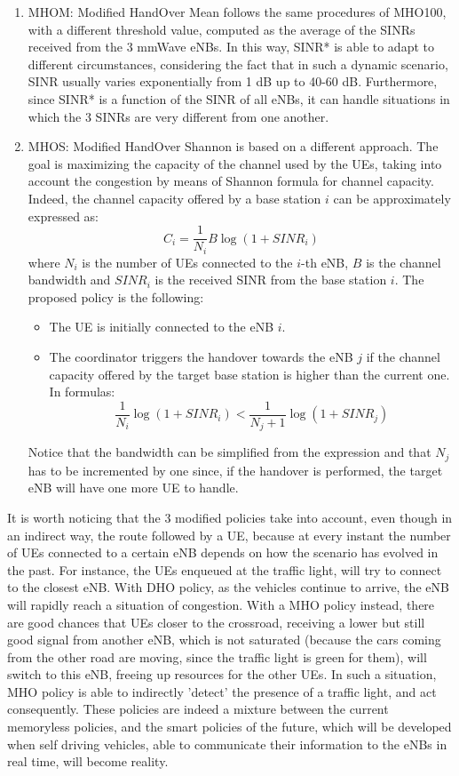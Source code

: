 \documentclass[conference,10pt]{IEEEtran}
\begin{document}
\begin{enumerate}
\item MHOM:
Modified HandOver Mean follows the same procedures of MHO100, with a different threshold value, computed as the average of the SINRs received from the 3 mmWave eNBs. In this way, SINR* is able to adapt to different circumstances, considering the fact that in such a dynamic scenario, SINR usually varies exponentially from 1 dB up to 40-60 dB. Furthermore, since SINR* is a function of the SINR of all eNBs, it can handle situations in which the 3 SINRs are very different from one another.



\item MHOS:
Modified HandOver Shannon is based on a different approach. The goal is maximizing the capacity of the channel used by the UEs, taking into account the congestion by means of Shannon formula for channel capacity. Indeed, the channel capacity offered by a base station $i$ can be approximately expressed as:
 $$
 C_i=\frac{1}{N_i} B \log(1+SINR_i)
 $$
\noindent where $N_i$ is the number of UEs connected to the $i$-th eNB, $B$ is the channel bandwidth and $SINR_i$ is the received SINR from the base station $i$.
The proposed policy is the following:

\begin{itemize}
	\item The UE is initially connected to the eNB $i$.
	\item The coordinator triggers the handover towards the eNB $j$ if the channel capacity offered by the target base station is higher than the current one. In formulas:
	$$
	\frac{1}{N_i} \log(1+SINR_i) < \frac{1}{N_j+1} \log(1+SINR_j)
	$$ 
\end{itemize}
\noindent Notice that the bandwidth can be simplified from the expression and that $N_j$ has to be incremented by one since, if the handover is performed, the target eNB will have one more UE to handle.
\end{enumerate}

It is worth noticing that the 3 modified policies take into account, even though in an indirect way, the route followed by a UE, because at every instant the number of UEs connected to a certain eNB depends on how the scenario has evolved in the past. For instance, the UEs enqueued at the traffic light, will try to connect to the closest eNB. With DHO policy, as the vehicles continue to arrive, the eNB will rapidly reach a situation of congestion. With a MHO policy instead, there are good chances that UEs closer to the crossroad, receiving a lower but still good signal from another eNB, which is not saturated (because the cars coming from the other road are moving, since the traffic light is green for them), will switch to this eNB, freeing up resources for the other UEs. In such a situation, MHO policy is able to indirectly 'detect' the presence of a traffic light, and act consequently. These policies are indeed a mixture between the current memoryless policies, and the smart policies of the future, which will be developed when self driving vehicles, able to communicate their information to the eNBs in real time, will become reality.
\end{document}
